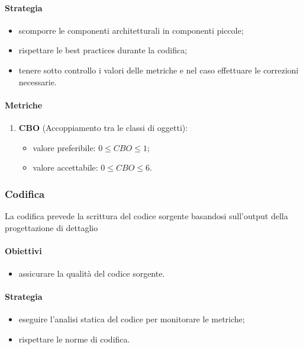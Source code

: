         \paragraph{Strategia}
            \begin{itemize}
                \item scomporre le componenti architetturali in componenti piccole;
                \item rispettare le best practices durante la codifica;
                \item tenere sotto controllo i valori delle metriche e nel caso effettuare le correzioni necessarie.
            \end{itemize}
        \paragraph{Metriche}
            \begin{enumerate}
                \item \textbf{CBO} (Accoppiamento tra le classi di oggetti):
                \begin{itemize}
                    \item valore preferibile: $0 \leq CBO\leq 1$;
                    \item valore accettabile: $0 \leq CBO\leq 6$.
                \end{itemize}
            \end{enumerate}
    \subsubsection{Codifica}
        La codifica prevede la scrittura del codice sorgente basandosi sull'output della progettazione di dettaglio
        \paragraph{Obiettivi}
            \begin{itemize}
                \item assicurare la qualità del codice sorgente.
            \end{itemize}
        \paragraph{Strategia}
            \begin{itemize}
                \item eseguire l'analisi statica del codice per monitorare le metriche;
                \item rispettare le norme di codifica.
            \end{itemize}

